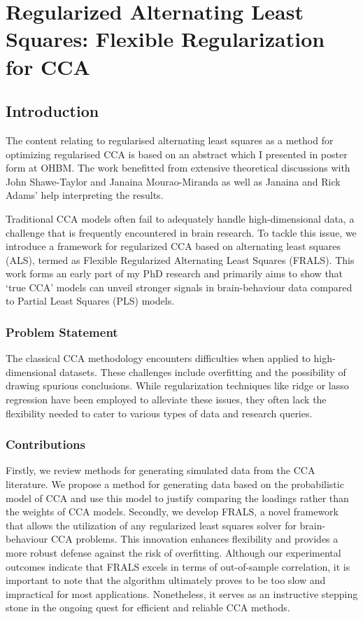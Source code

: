 \chapter{Regularized Alternating Least Squares: Flexible Regularization for CCA}
\label{chap:als}
\minitoc

\section{Introduction}\label{sec:introduction}

The content relating to regularised alternating least squares as a method for optimizing regularised CCA is based on an abstract which I presented in poster form at OHBM. The work benefitted from extensive theoretical discussions with John Shawe-Taylor and Janaina Mourao-Miranda as well as Janaina and Rick Adams' help interpreting the results.

Traditional CCA models often fail to adequately handle high-dimensional data, a challenge that is frequently encountered in brain research.
To tackle this issue, we introduce a framework for regularized CCA based on alternating least squares (ALS), termed
as Flexible Regularized Alternating Least Squares (FRALS). This work forms an early part of my PhD research and primarily aims to show that `true CCA' models can unveil stronger signals in brain-behaviour data compared to Partial Least Squares (PLS) models.

\subsection{Problem Statement}\label{subsec:problem-statement}
The classical CCA methodology encounters difficulties when applied to high-dimensional datasets.
These challenges include overfitting and the possibility of drawing spurious conclusions.
While regularization techniques like ridge or lasso regression have been employed to alleviate these issues, they often lack the flexibility needed to cater to various types of data and research queries.

\subsection{Contributions}\label{subsec:contributions}
Firstly, we review methods for generating simulated data from the CCA literature. We propose a method for generating
data based on the probabilistic model of CCA and use this model to justify comparing the loadings rather than the
weights of CCA models.
Secondly, we develop FRALS, a novel framework that allows the utilization of any regularized least squares solver for
brain-behaviour CCA problems.
This innovation enhances flexibility and provides a more robust defense against the risk of overfitting.
Although our experimental outcomes indicate that FRALS excels in terms of out-of-sample correlation, it is important to note that the algorithm ultimately proves to be too slow and impractical for most applications.
Nonetheless, it serves as an instructive stepping stone in the ongoing quest for efficient and reliable CCA methods.


